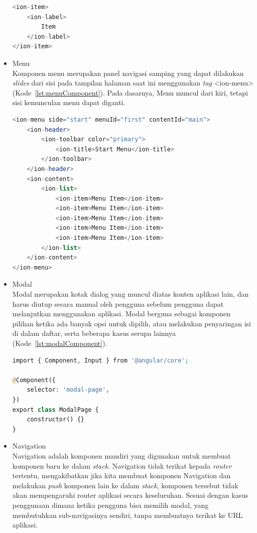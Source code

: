 \begin{itemize}
	\begin{lstlisting}[language=php, label={lst:itemComponent}, caption=Potongan Kode Program dari Item Component]
<ion-item>
	<ion-label>
		Item
	</ion-label>
</ion-item>
	\end{lstlisting} 
	\item Menu \\
	Komponen menu merupakan panel navigasi samping yang dapat dilakukan {\it slides} dari sisi pada tampilan halaman saat ini menggunakan {\it tag} <ion-menu> (Kode~\ref{lst:menuComponent}). Pada dasarnya, Menu muncul dari kiri, tetapi sisi kemunculan menu dapat diganti. 

	\begin{lstlisting}[language=php, label={lst:menuComponent}, caption=Potongan Kode Program dari Menu Component]
<ion-menu side="start" menuId="first" contentId="main">
	<ion-header>
		<ion-toolbar color="primary">
			<ion-title>Start Menu</ion-title>
		</ion-toolbar>
	</ion-header>
	<ion-content>
		<ion-list>
			<ion-item>Menu Item</ion-item>
			<ion-item>Menu Item</ion-item>
			<ion-item>Menu Item</ion-item>
			<ion-item>Menu Item</ion-item>
			<ion-item>Menu Item</ion-item>
		</ion-list>
	</ion-content>
</ion-menu>
	\end{lstlisting} 
	\item Modal \\
	Modal merupakan kotak dialog yang muncul diatas konten aplikasi lain, dan harus diutup secara manual oleh pengguna sebelum pengguna dapat melanjutkan menggunakan aplikasi. Modal berguna sebagai komponen pilihan ketika ada banyak opsi untuk dipilih, atau melakukan penyaringan isi di dalam daftar, serta beberapa kasus serupa lainnya (Kode~\ref{lst:modalComponent}).
		\begin{lstlisting}[language=php, label={lst:modalComponent}, caption=Kode Program dari Modal]
import { Component, Input } from '@angular/core';

@Component({
	selector: 'modal-page',
})
export class ModalPage {	
	constructor() {}		
}
		\end{lstlisting} 

	\item Navigation \\
	Navigation adalah komponen mandiri yang digunakan untuk membuat komponen baru ke dalam {\it stack}. Navigation tidak terikat kepada {\it router} tertentu, mengakibatkan jika kita membuat komponen Navigation dan melakukan {\it push} komponen lain ke dalam {\it stack}, komponen tersebut tidak akan mempengaruhi router aplikasi secara keseluruhan. Sesuai dengan kasus penggunaan dimana ketika pengguna bisa memilih modal, yang membutuhkan sub-navigasinya sendiri, tanpa membuatnya terikat ke URL aplikasi. 


\end{itemize}
